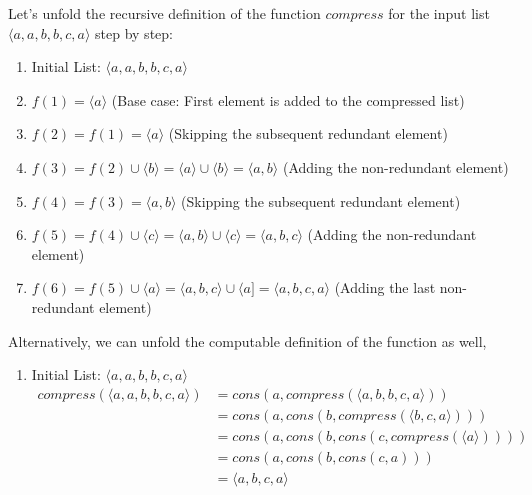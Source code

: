 \documentclass[12pt]{article}
\begin{document}
\begin{spacing}{1.5}
\begin{enumerate}
		      Let's unfold the recursive definition of the function $compress$ for the input list $\langle a, a, b, b, c, a \rangle$ step by step:
		      		      
		      \begin{enumerate}
		      	\item Initial List: $\langle a, a, b, b, c, a \rangle$
		      	      		      	      
		      	\item $f(1) = \langle a \rangle$ (Base case: First element is added to the compressed list)
		      	      		      	      
		      	\item $f(2) = f(1) = \langle a \rangle$ (Skipping the subsequent redundant element)
		      	      		      	      
		      	\item $f(3) = f(2) \cup \langle b \rangle = \langle a \rangle \cup \langle b \rangle = \langle a, b \rangle$ (Adding the non-redundant element)
		      	      		      	      
		      	\item $f(4) = f(3) = \langle a, b \rangle$ (Skipping the subsequent redundant element)
		      	      		      	      
		      	\item $f(5) = f(4) \cup \langle c \rangle = \langle a, b \rangle \cup \langle c \rangle = \langle a, b, c \rangle$ (Adding the non-redundant element)
		      	      		      	      
		      	\item $f(6) = f(5) \cup \langle a \rangle = \langle a, b, c \rangle \cup \langle a] = \langle a, b, c, a \rangle$ (Adding the last non-redundant element)
		      \end{enumerate}
		      
		      Alternatively, we can unfold the computable definition of the function as well, \\
		      
		      \begin{enumerate}
		      	\item Initial List: $\langle a, a, b, b, c, a \rangle$
		      	      \begin{align*}
		      	      	compress(\langle a, a, b, b, c, a \rangle) & = cons(a, compress(\langle a, b, b, c, a \rangle))       \\
                           & = cons(a, cons(b, compress(\langle b, c, a \rangle)))    \\
                           & = cons(a, cons(b, cons(c, compress(\langle a \rangle)))) \\
                           & = cons(a, cons(b, cons(c, a)))                           \\
                           & = \langle a, b, c, a \rangle                             
		      	      \end{align*}
		      	                      

\end{enumerate}
\end{enumerate}
\end{spacing}
\end{document}
